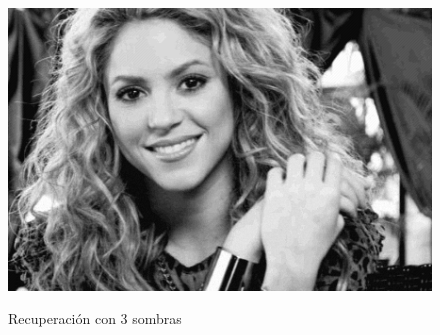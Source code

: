 \documentclass{article}
\begin{document}
\begin{figure}[h!]
{    \includegraphics[scale=0.5]{./3sombras/Shakira3.png}
  }
   \caption{Recuperación con 3 sombras}
  \label{fig:3sombras}
\end{figure}
\end{document}
